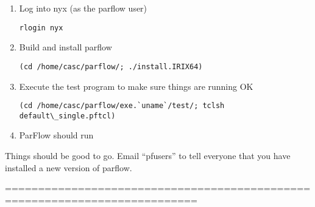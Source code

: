 \begin{enumerate}
\item
Log into nyx (as the parflow user)
\begin{display}\begin{verbatim}
rlogin nyx
\end{verbatim}\end{display}
\item
Build and install parflow
\begin{display}\begin{verbatim}
(cd /home/casc/parflow/; ./install.IRIX64)
\end{verbatim}\end{display}
\item
Execute the test program to make sure things are running OK
\begin{display}\begin{verbatim}
(cd /home/casc/parflow/exe.`uname`/test/; tclsh default\_single.pftcl)
\end{verbatim}\end{display}
\item
ParFlow should run
\end{enumerate}

Things should be good to go.  Email ``pfusers'' to tell everyone
that you have installed a new version of parflow.

===========================================================================



